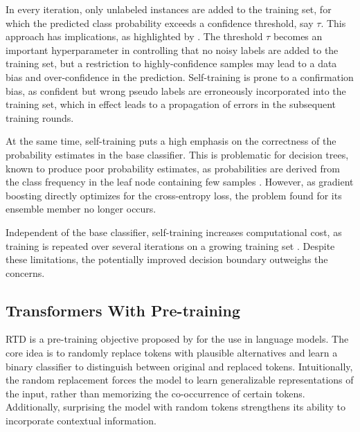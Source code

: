 In every iteration, only unlabeled instances are added to the training set, for which the predicted class probability exceeds a confidence threshold, say $\tau$. This approach has implications, as highlighted by \textcite[\checkmark][32427]{chenDebiasedSelfTrainingSemiSupervised2022}. The threshold $\tau$ becomes an important hyperparameter in controlling that no noisy labels are added to the training set, but a restriction to highly-confidence samples may lead to a data bias and over-confidence in the prediction. Self-training is prone to a confirmation bias, as confident but wrong pseudo labels are erroneously incorporated into the training set, which in effect leads to a propagation of errors in the subsequent training rounds.

At the same time, self-training puts a high emphasis on the correctness of the probability estimates in the base classifier. This is problematic for decision trees, known to produce poor probability estimates, as probabilities are derived from the class frequency in the leaf node containing few samples \autocite[\checkmark][357--358]{tanhaSemisupervisedSelftrainingDecision2017}. However, as gradient boosting directly optimizes for the cross-entropy loss, the problem found for its ensemble member no longer occurs.

Independent of the base classifier, self-training increases computational cost, as training is repeated over several iterations on a growing training set \autocite[\checkmark][3841]{zophRethinkingPretrainingSelftraining2020}. Despite these limitations, the potentially improved decision boundary outweighs the concerns.

\subsection{Transformers With Pre-training}\label{sec:extensions-to-transformer}

\gls{RTD} is a pre-training objective proposed by \textcite[\checkmark][2--3]{clarkElectraPretrainingText2020} for the use in language models. The core idea is to randomly replace tokens with plausible alternatives and learn a binary classifier to distinguish between original and replaced tokens. Intuitionally, the random replacement forces the model to learn generalizable representations of the input, rather than memorizing the co-occurrence of certain tokens. Additionally, surprising the model with random tokens strengthens its ability to incorporate contextual information.

